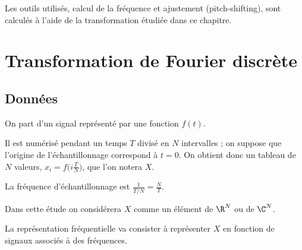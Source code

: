 Les outils utilisés, calcul de la fréquence et ajustement (pitch-shifting), sont calculés à l'aide de la transformation étudiée dans ce chapitre.
\section{Transformation de Fourier discrète}
\subsection{Données}
On part d'un signal représenté par une fonction $f(t)$.

Il est numérisé pendant un temps $T$ divisé en $N$ intervalles ; on suppose que l'origine de l'échantillonnage
correspond à $t=0$. On obtient donc un tableau de $N$ valeurs, $x_i = f\bigl(i\frac TN\bigr)$, que l'on notera $X$.

La fréquence d'échantillonnage est $\frac 1{T/N}=\frac {N}T$.

Dans cette étude on considérera $X$ comme un élément de $\R^N$ ou de $\C^N$.

\medskip

La représentation fréquentielle va consister à représenter $X$ en fonction de signaux associés à des fréquences.

